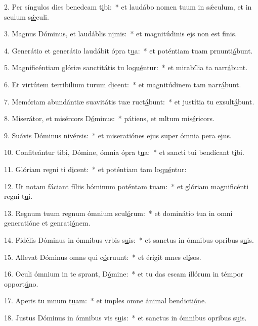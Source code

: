 2. Per síngulos dies benedcam t\uline{i}bi:~* et laudábo nomen tuum in sǽculum, et in sculum s\uline{ǽ}culi.\par 
3. Magnus Dóminus, et laudáblis n\uline{i}mis:~* et magnitúdinis ejs non est f\uline{i}nis.\par 
4. Generátio et generátio laudábit ópra t\uline{u}a:~* et poténtiam tuam prnunti\uline{á}bunt.\par 
5. Magnificéntiam glóriæ sanctitátis tu lo\uline{qué}ntur:~* et mirabília ta narr\uline{á}bunt.\par 
6. Et virtútem terribílium turum d\uline{i}cent:~* et magnitúdinem tam narr\uline{á}bunt.\par 
7. Memóriam abundántiæ suavitátis tuæ ruct\uline{á}bunt:~* et justítia tu exsult\uline{á}bunt.\par 
8. Miserátor, et misércors D\uline{ó}minus:~* pátiens, et mltum mis\uline{é}ricors.\par 
9. Suávis Dóminus niv\uline{é}rsis:~* et miseratiónes ejus super ómnia pera \uline{e}jus.\par 
10. Confiteántur tibi, Dómine, ómnia ópra t\uline{u}a:~* et sancti tui bendícant t\uline{i}bi.\par 
11. Glóriam regni ti d\uline{i}cent:~* et poténtiam tam lo\uline{qué}ntur:\par 
12. Ut notam fáciant fíliis hóminum poténtam t\uline{u}am:~* et glóriam magnificénti regni t\uline{u}i.\par 
13. Regnum tuum regnum ómnium scul\uline{ó}rum:~* et dominátio tua in omni generatióne et genrati\uline{ó}nem.\par 
14. Fidélis Dóminus in ómnibus vrbis s\uline{u}is:~* et sanctus in ómnibus opribus s\uline{u}is.\par 
15. Allevat Dóminus omns qui c\uline{ó}rruunt:~* et érigit mnes el\uline{í}sos.\par 
16. Oculi ómnium in te sprant, D\uline{ó}mine:~* et tu das escam illórum in témpor opport\uline{ú}no.\par 
17. Aperis tu mnum t\uline{u}am:~* et imples omne ánimal bendicti\uline{ó}ne.\par 
18. Justus Dóminus in ómnibus vis s\uline{u}is:~* et sanctus in ómnibus opribus s\uline{u}is.\par 
